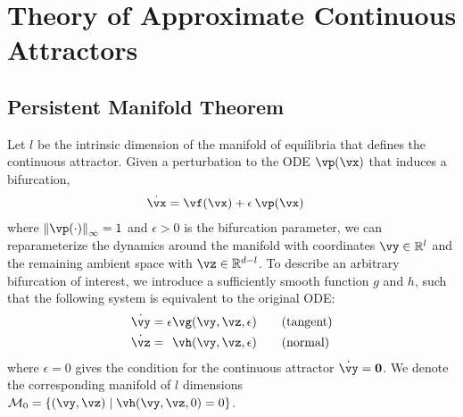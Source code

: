 \documentclass{article} %
\newcounter{ct}
\newcommand{\reals}{\mathbb{R}}
\newcommand{\manifold}{\mathcal{M}}
\newcommand{\uniformNorm}[1]{\left\|#1\right\|_\infty} %
\theoremstyle{definition}
\theoremstyle{remark}
\begin{document}
\section{Theory of Approximate Continuous Attractors}\label{sec:theory}
\subsection{Persistent Manifold Theorem}\label{sec:imt}
Let $l$ be the intrinsic dimension of the manifold of equilibria that defines the continuous attractor.
Given a perturbation to the ODE $\vp(\vx)$ that induces a bifurcation,
\begin{align}\label{eq:perturbation:nonparam}
	\dot{\vx} &= \vf(\vx) + \epsilon\,\vp(\vx)
\end{align}
where $\uniformNorm{\vp(\cdot)} = 1$ and $\epsilon > 0$ is the bifurcation parameter,
we can reparameterize the dynamics around the manifold with coordinates $\vy \in \reals^l$ and the remaining ambient space with $\vz \in \reals^{d-l}$.
To describe an arbitrary bifurcation of interest, we introduce a sufficiently smooth function $g$ and $h$, such that the following system is equivalent to the original ODE:
\begin{align}\label{eq:fenichel:flow}
    \dot{\vy} &=           \epsilon  \vg(\vy, \vz, \epsilon) \qquad \text{(tangent)}\\
    \dot{\vz} &= \hphantom{\epsilon} \vh(\vy, \vz, \epsilon) \qquad \text{(normal)}
\end{align}
where $\epsilon = 0$ gives the condition for the continuous attractor $\dot{\vy} = \mathbf{0}$.
We denote the corresponding manifold of $l$ dimensions $\manifold_0 = \{(\vy,\vz) \mid \vh(\vy,\vz,0) = 0\}$.
\end{document}
